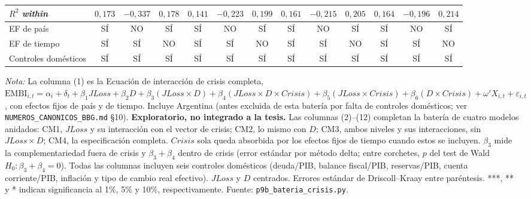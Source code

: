\documentclass[11pt]{article}
\begin{document}
\begin{landscape}
\begin{table}
\begin{tabular}{l c ccc ccc ccc cc}
$R^2$ \textit{within} & $0{,}173$ & $-0{,}337$ & $0{,}178$ & $0{,}141$ & $-0{,}223$ & $0{,}199$ & $0{,}161$ & $-0{,}215$ & $0{,}205$ & $0{,}164$ & $-0{,}196$ & $0{,}214$ \\
\midrule
EF de país & SÍ & NO & SÍ & SÍ & NO & SÍ & SÍ & NO & SÍ & SÍ & NO & SÍ \\
EF de tiempo & SÍ & SÍ & NO & SÍ & SÍ & NO & SÍ & SÍ & NO & SÍ & SÍ & NO \\
Controles domésticos & SÍ & SÍ & SÍ & SÍ & SÍ & SÍ & SÍ & SÍ & SÍ & SÍ & SÍ & SÍ \\
\bottomrule
\end{tabular}
\par\smallskip\parbox{\linewidth}{\scriptsize \textit{Nota:} La columna (1) es la Ecuación de interacción de crisis completa, $\mathrm{EMBI}_{i,t}=\alpha_i+\delta_t+\beta_1 JLoss+\beta_2 D+\beta_3(JLoss\times D)+\beta_4(JLoss\times D\times Crisis)+\beta_5(JLoss\times Crisis)+\beta_6(D\times Crisis)+\omega'X_{i,t}+\varepsilon_{i,t}$, con efectos fijos de país y de tiempo. Incluye Argentina (antes excluida de esta batería por falta de controles domésticos; ver \texttt{NUMEROS\_CANONICOS\_BBG.md} \S10). \textbf{Exploratorio, no integrado a la tesis.} Las columnas (2)--(12) completan la batería de cuatro modelos anidados: CM1, $JLoss$ y su interacción con el vector de crisis; CM2, lo mismo con $D$; CM3, ambos niveles y sus interacciones, sin $JLoss\times D$; CM4, la especificación completa. $Crisis$ sola queda absorbida por los efectos fijos de tiempo cuando estos se incluyen. $\beta_3$ mide la complementariedad fuera de crisis y $\beta_3+\beta_4$ dentro de crisis (error estándar por método delta; entre corchetes, $p$ del test de Wald $H_0\!:\beta_3+\beta_4=0$). Todas las columnas incluyen seis controles domésticos (deuda/PIB, balance fiscal/PIB, reservas/PIB, cuenta corriente/PIB, inflación y tipo de cambio real efectivo). $JLoss$ y $D$ centrados. Errores estándar de Driscoll--Kraay entre paréntesis. ***, ** y * indican significancia al 1\%, 5\% y 10\%, respectivamente. Fuente: \texttt{p9b\_bateria\_crisis.py}.}
\end{table}
\end{landscape}
\end{document}
